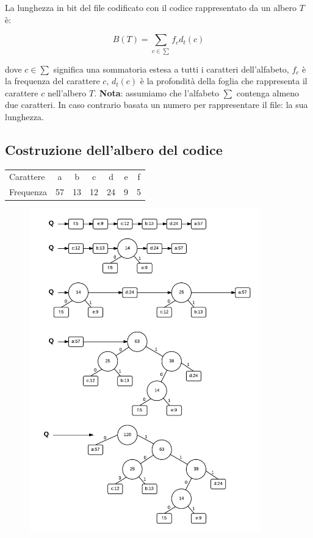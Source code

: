 La lunghezza in bit del file codificato con il codice rappresentato da un albero $T$ è:

$$B(T)=\sum_{c\in\sum}f_cd_t(c)$$

dove $c\in\sum$ significa una sommatoria estesa a tutti i caratteri dell'alfabeto, $f_c$ è la frequenza del carattere $c$, $d_t(c)$ è la profondità della foglia che rappresenta il carattere $c$ nell'albero $T$.
\linebreak
\linebreak
\textbf{Nota}: assumiamo che l'alfabeto $\sum$ contenga almeno due caratteri. In caso contrario basata un numero per rappresentare il file: la sua lunghezza.

\subsection{Costruzione dell'albero del codice}

\begin{center}
\begin{tabular}[htpd]{| l | c c c c c c |}

\hline
Carattere & a & b & c & d & e & f \\
Frequenza & 57 & 13 & 12 & 24 & 9 & 5 \\
\hline
\end{tabular}
\end{center}

\begin{figure}[htpd]
\centering
\includegraphics[width=100mm]{images/huff4.png}
\end{figure}

